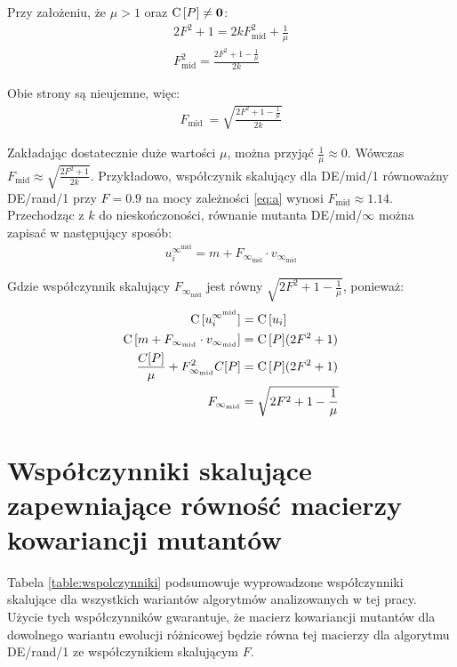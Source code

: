 \documentclass[a4paper,onecolumn,oneside,12pt,wide,floatssmall]{mwrep}
\def\C{{\rm C}\,}
\theoremstyle{definition}
\theoremstyle{plain}%
\theoremstyle{remark}
\begin{document}
Przy założeniu, że $\mu > 1$ oraz $\C[P] \neq \textbf{0}$:
\begin{align*}
2F^2 + 1 = 2kF_\text{mid}^2 + \frac{1}{\mu} \\
F_\text{mid}^2 = \frac{2F^2 + 1 - \frac{1}{\mu}}{2k}
\end{align*}

Obie strony są nieujemne, więc:
\begin{align} \label{eq:a}
F_\text{mid}\ = \sqrt{\frac{2F^2 + 1 - \frac{1}{\mu}}{2k}}
\end{align}

Zakładając dostatecznie duże wartości $\mu$, można przyjąć $\frac{1}{\mu} \approx 0$.
Wówczas \mbox{$F_\text{mid} \approx \sqrt{\frac{2F^2 + 1}{2k}}$}.
Przykładowo, współczynik skalujący dla DE/mid/1 równoważny DE/rand/1 przy $F = 0.9$ 
na mocy zależności \eqref{eq:a} wynosi $F_\text{mid} \approx 1.14$. \\

Przechodząc z $k$ do nieskończoności, równanie mutanta DE/mid/$\infty$ można zapisać
w następujący sposób:
\begin{align*}
u_i^{\infty^\text{mid}} = m + F_{\infty_\text{mid}} \cdot v_{\infty_\text{mid}}
\end{align*}

Gdzie współczynnik skalujący $F_{\infty_\text{mid}}$ jest równy $\sqrt{2F^2 + 1 - \frac{1}{\mu}}$, ponieważ:
\begin{align*}
\C[u_i^{\infty^\text{mid}}] &= \C[u_i] \\
\C[m + F_{\infty_\text{mid}} \cdot v_{\infty_\text{mid}}] &= \C[P](2F^2 + 1) \\
\frac{C[P]}{\mu} + F_{\infty_\text{mid}}^2 C[P] &= \C[P](2F^2 + 1) \\
F_{\infty_\text{mid}} &= \sqrt{2F^2 + 1 - \frac{1}{\mu}}
\end{align*}

\section{Współczynniki skalujące zapewniające równość macierzy kowariancji mutantów}

Tabela \ref{table:wspolczynniki} podsumowuje wyprowadzone współczynniki skalujące dla wszystkich
wariantów algorytmów analizowanych w tej pracy. Użycie tych współczynników gwarantuje, że macierz
kowariancji mutantów dla dowolnego wariantu ewolucji różnicowej będzie równa tej macierzy dla algorytmu
DE/rand/1 ze współczynikiem skalującym $F$.
\end{document}
